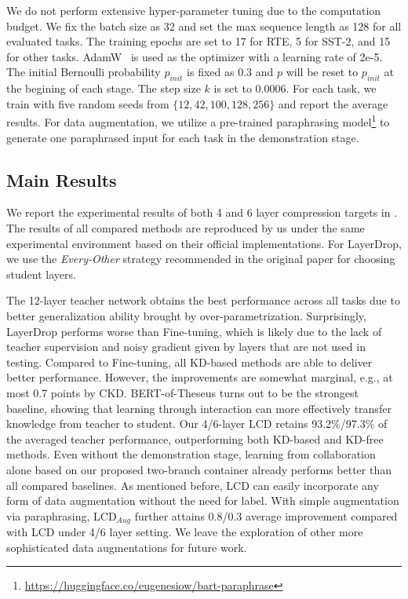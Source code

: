 We do not perform extensive hyper-parameter tuning due to the computation budget. We fix the batch size as 32 and set the max sequence length as 128 for all evaluated tasks. The training epochs are set to 17 for RTE, 5 for SST-2, and 15 for other tasks. AdamW~\cite{adamw} is used as the optimizer with a learning rate of 2e-5. The initial Bernoulli probability $p_{init}$ is fixed as 0.3 and $p$ will be reset to $p_{init}$ at the begining of each stage. The 
step size $k$ is set to 0.0006. For each task, we train with five random seeds from $\{12,42,100,128,256\}$ and report the average results. For data augmentation, we utilize a pre-trained paraphrasing model\footnote{\url{https://huggingface.co/eugenesiow/bart-paraphrase}}\cite{bart} to generate one paraphrased input for each task in the demonstration stage.


\subsection{Main Results}

We report the experimental results of both 4 and 6 layer compression targets in . The results of all compared methods are reproduced by us under the same experimental environment based on their 
official implementations. For LayerDrop, we use the \textit{Every-Other} strategy recommended in the original paper for choosing student layers.

The 12-layer teacher network obtains the best performance across all tasks due to better generalization ability brought by over-parametrization. 
Surprisingly, LayerDrop performs worse than Fine-tuning, which is likely due to 
the lack of teacher supervision and noisy gradient given by layers that are not used in testing. Compared to Fine-tuning, all KD-based methods are able to deliver better 
performance. However, the improvements are somewhat marginal, e.g., at most 0.7 points by CKD. BERT-of-Theseus turns out to be the strongest baseline, showing that 
learning through interaction can more effectively transfer knowledge from teacher to student. Our 4/6-layer LCD retains 93.2\%/97.3\% of the averaged teacher performance, outperforming both KD-based and KD-free methods. 
Even without the demonstration stage, learning from collaboration alone based on our proposed two-branch container already performs better than all compared baselines. As mentioned before, LCD can easily incorporate 
any form of data augmentation without the need for label. With simple augmentation via paraphrasing, LCD$_{Aug}$ further attains 0.8/0.3 average improvement compared with LCD under 4/6 layer setting. We leave the exploration of other more sophisticated data augmentations for future work.

